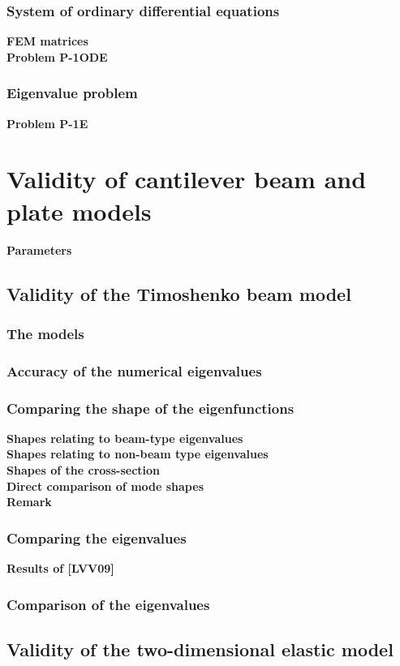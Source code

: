 \documentclass[../main.tex]{subfiles}
\begin{document}
\subsubsection{System of ordinary differential equations}
\textbf{FEM matrices}\\
\textbf{Problem P-1ODE}
\subsubsection{Eigenvalue problem}
\textbf{Problem P-1E}
\section{Validity of cantilever beam and plate models}
\textbf{Parameters}
\subsection{Validity of the Timoshenko beam model}
\subsubsection{The models}
\subsubsection{Accuracy of the numerical eigenvalues}
\subsubsection{Comparing the shape of the eigenfunctions}
\textbf{Shapes relating to beam-type eigenvalues}\\
\textbf{Shapes relating to non-beam type eigenvalues}\\
\textbf{Shapes of the cross-section}\\
\textbf{Direct comparison of mode shapes}\\
\textbf{Remark}
\subsubsection{Comparing the eigenvalues}
\textbf{Results of [LVV09]}
\subsubsection{Comparison of the eigenvalues}
\subsection{Validity of the two-dimensional elastic model}
\end{document}
